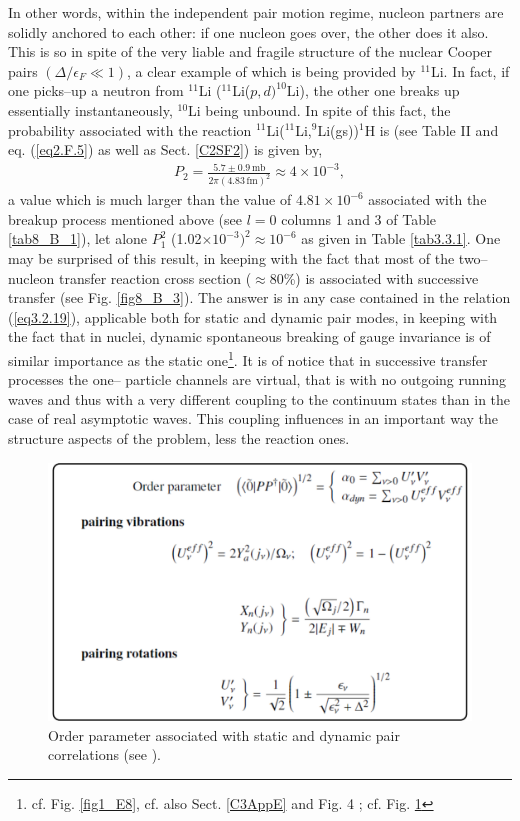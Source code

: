In other words, within the independent pair motion regime, nucleon partners are solidly anchored to each other: if one nucleon goes over, the other does it also. This is so in spite of the very liable and fragile structure of the nuclear Cooper pairs $(\Delta/\epsilon_F\ll1)$, a clear example of which is being provided by $^{11}$Li. In fact, if one picks--up a neutron from $^{11}$Li ($^{11}$Li($p,d)^{10}$Li), the other one breaks up essentially instantaneously, $^{10}$Li being unbound. In spite of this fact, the probability associated with the reaction $^{11}$Li($^{11}$Li,$^9$Li(gs))$^{1}$H is (see Table II \cite{Potel:10} and eq. (\ref{eq2.F.5}) as well as Sect. \ref{C2SF2})  is given by,
\begin{align}
P_2=\frac{5.7\pm0.9\,\text{mb}}{2\pi(4.83\,\text{fm})^2}\approx 4\times10^{-3},
\end{align}
a value which is much larger than the value of $4.81\times10^{-6}$ associated with the breakup process mentioned above (see $l=0$ columns 1 and 3 of Table \ref{tab8_B_1}), let alone $P_1^2$ (1.02$\times 10^{-3})^2\approx 10^{-6}$ as given in Table \ref{tab3.3.1}. One may be surprised of this result, in keeping with the fact that most of the two--nucleon transfer reaction cross section ($\approx 80$\%) is associated with successive transfer (see Fig. \ref{fig8_B_3}). The answer is in any case contained in the relation (\ref{eq3.2.19}), applicable both for static and dynamic pair modes, in keeping with the fact that in nuclei, dynamic spontaneous breaking of gauge invariance is of similar importance as the static one\footnote{cf. Fig. \ref{fig1_E8}, cf. also Sect. \ref{C3AppE} and Fig. 4 \cite{Potel:13b}; cf. Fig. \ref{fig3.3.2}}. It is of notice that in successive transfer processes the one-- particle channels are virtual, that is with no outgoing running waves and thus with a very different coupling to the continuum states than in the case of real asymptotic waves. This coupling influences in an important  way the structure aspects of the problem,  less the reaction ones.
\begin{figure}
\centerline{\includegraphics*[width=15cm,angle=0]{nutshell/figs/fig3_3_2.pdf}}
\caption{Order parameter associated with static and dynamic pair correlations (see \cite{Potel:13b}).}\label{fig3.3.2}
\end{figure}
